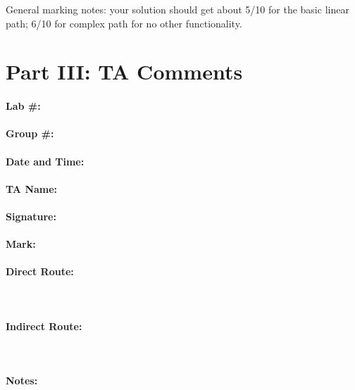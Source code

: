 \documentclass[10pt]{article}
\begin{document}
General marking notes: your solution should get about 5/10 for the basic linear path; 6/10 for complex path for no other functionality.

\newpage

\section*{Part III: TA Comments}

\paragraph{Lab \#:}
\paragraph{Group \#:}
\paragraph{Date and Time:}

\paragraph{TA Name:}
\paragraph{Signature:}

\paragraph{Mark:}

\paragraph{Direct Route:}~\\[3em]

\paragraph{Indirect Route:}~\\[3em]

\paragraph{Notes:}
\end{document}
